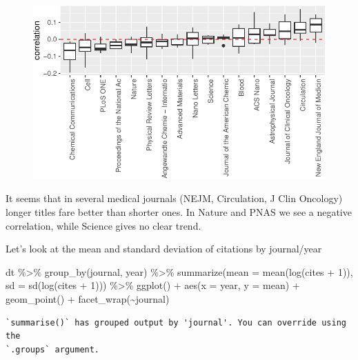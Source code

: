 \documentclass[
  letterpaper,
  DIV=11,
  numbers=noendperiod]{scrreprt}
\newenvironment{Shaded}{\begin{snugshade}}{\end{snugshade}}
\newcommand{\AttributeTok}[1]{\textcolor[rgb]{0.40,0.45,0.13}{#1}}
\newcommand{\DecValTok}[1]{\textcolor[rgb]{0.68,0.00,0.00}{#1}}
\newcommand{\FunctionTok}[1]{\textcolor[rgb]{0.28,0.35,0.67}{#1}}
\newcommand{\NormalTok}[1]{\textcolor[rgb]{0.00,0.23,0.31}{#1}}
\newcommand{\SpecialCharTok}[1]{\textcolor[rgb]{0.37,0.37,0.37}{#1}}
\begin{document}
\begin{figure}[H]

{\centering \includegraphics{./10-model_selection_files/figure-pdf/unnamed-chunk-37-1.pdf}

}

\end{figure}

It seems that in several medical journals (NEJM, Circulation, J Clin
Oncology) longer titles fare better than shorter ones. In Nature and
PNAS we see a negative correlation, while Science gives no clear trend.

Let's look at the mean and standard deviation of citations by
journal/year

\begin{Shaded}
\begin{Highlighting}[]
\NormalTok{dt }\SpecialCharTok{\%\textgreater{}\%} 
  \FunctionTok{group\_by}\NormalTok{(journal, year) }\SpecialCharTok{\%\textgreater{}\%} 
  \FunctionTok{summarize}\NormalTok{(}\AttributeTok{mean =} \FunctionTok{mean}\NormalTok{(}\FunctionTok{log}\NormalTok{(cites }\SpecialCharTok{+} \DecValTok{1}\NormalTok{)), }\AttributeTok{sd =} \FunctionTok{sd}\NormalTok{(}\FunctionTok{log}\NormalTok{(cites }\SpecialCharTok{+} \DecValTok{1}\NormalTok{))) }\SpecialCharTok{\%\textgreater{}\%} 
  \FunctionTok{ggplot}\NormalTok{() }\SpecialCharTok{+} 
  \FunctionTok{aes}\NormalTok{(}\AttributeTok{x =}\NormalTok{ year, }\AttributeTok{y =}\NormalTok{ mean) }\SpecialCharTok{+} 
  \FunctionTok{geom\_point}\NormalTok{() }\SpecialCharTok{+} 
  \FunctionTok{facet\_wrap}\NormalTok{(}\SpecialCharTok{\textasciitilde{}}\NormalTok{journal)}
\end{Highlighting}
\end{Shaded}

\begin{verbatim}
`summarise()` has grouped output by 'journal'. You can override using the
`.groups` argument.
\end{verbatim}
\end{document}
